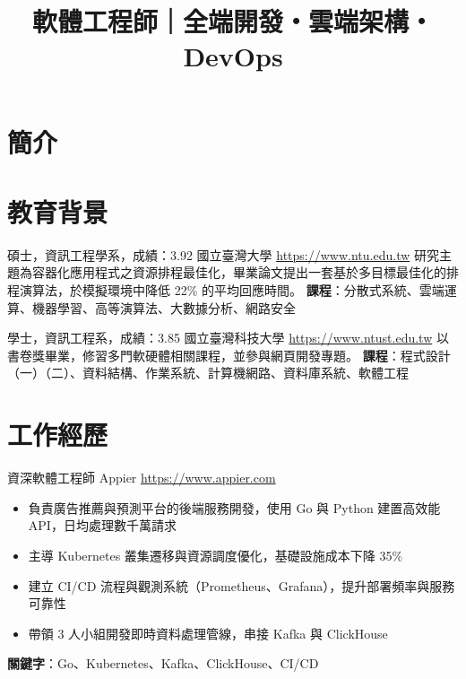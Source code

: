 \documentclass[a4paper, serif, 10pt]{moderncv}
\title{軟體工程師｜全端開發・雲端架構・DevOps}
\begin{document}
\maketitle

\section{簡介}

\section{教育背景}

        {碩士，資訊工程學系，成績：3.92}
        {國立臺灣大學}
        {\url{https://www.ntu.edu.tw}}
        {}
        {研究主題為容器化應用程式之資源排程最佳化，畢業論文提出一套基於多目標最佳化的排程演算法，於模擬環境中降低 22\% 的平均回應時間。
\textbf{課程}：分散式系統、雲端運算、機器學習、高等演算法、大數據分析、網路安全}

        {學士，資訊工程系，成績：3.85}
        {國立臺灣科技大學}
        {\url{https://www.ntust.edu.tw}}
        {}
        {以書卷獎畢業，修習多門軟硬體相關課程，並參與網頁開發專題。
\textbf{課程}：程式設計（一）（二）、資料結構、作業系統、計算機網路、資料庫系統、軟體工程}
\section{工作經歷}

        {資深軟體工程師}
        {Appier}
        {\url{https://www.appier.com}}
        {}
        {\begin{itemize}
\item 負責廣告推薦與預測平台的後端服務開發，使用 Go 與 Python 建置高效能 API，日均處理數千萬請求
\item 主導 Kubernetes 叢集遷移與資源調度優化，基礎設施成本下降 35\%
\item 建立 CI/CD 流程與觀測系統（Prometheus、Grafana），提升部署頻率與服務可靠性
\item 帶領 3 人小組開發即時資料處理管線，串接 Kafka 與 ClickHouse
\end{itemize}
\textbf{關鍵字}：Go、Kubernetes、Kafka、ClickHouse、CI/CD}
\end{document}
